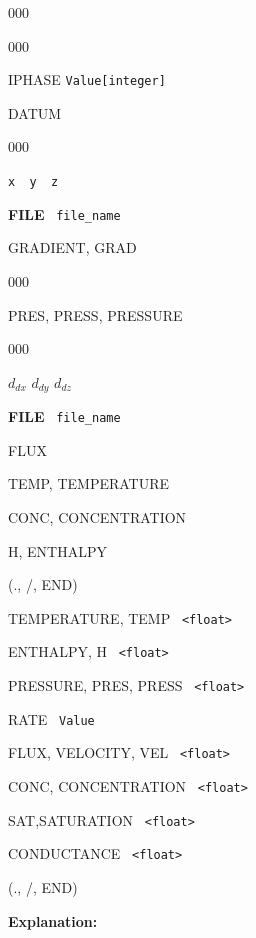 \documentclass[12pt]{article}
\begin{document}
\begin{deflist}{000}
\begin{deflist}{000}
\item[IPHASE] {\tt Value[integer]}

\item[DATUM] ~
\begin{deflist}{000}
\item[{\tt x \ y \ z}]
\item[{\bf FILE} \ {\tt file\_name}]
\end{deflist}
\item[GRADIENT, GRAD] ~
\begin{deflist}{000}
\item [PRES, PRESS, PRESSURE] ~
\begin{deflist}{000}
\item[$d_{dx}$ $d_{dy}$ $d_{dz}$]
\item[{\bf FILE} \ {\tt file\_name}]
\end{deflist}
\item [FLUX]
\item [TEMP, TEMPERATURE]
\item [CONC, CONCENTRATION]
\item [H, ENTHALPY]
\end{deflist}
\item[(., /, END)]
\item[TEMPERATURE, TEMP] \ {\tt <float>}
\item[ENTHALPY, H] \ {\tt <float>}
\item[PRESSURE, PRES, PRESS] \ {\tt <float>}
\item[RATE] \ {\tt Value}
\item[FLUX, VELOCITY, VEL] \ {\tt <float>}
\item[CONC, CONCENTRATION] \ {\tt <float>}
\item[SAT,SATURATION] \ {\tt <float>}
\item[CONDUCTANCE] \ {\tt <float>}
\end{deflist}
\item[(., /, END)] ~
\end{deflist}

{\noindent\bf Explanation:}
\end{document}
